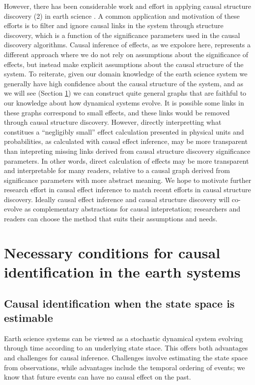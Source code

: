 \documentclass[12pt]{article}
\begin{document}
However, there has been considerable work and effort in applying
causal structure discovery (2) in earth science
\citep[e.g.,][]{ebert-uphoff2012,
  samarasinghe-casuality,runge-causal-timeseries,runge2019inferring}. A
common application and motivation of these efforts is to filter and
ignore causal links in the system through structure discovery, which
is a function of the significance parameters used in the causal
discovery algorithms. Causal inference of effects, as we expolore
here, represents a different approach where we do not rely on
assumptions about the significance of effects, but instead make
explicit assumptions about the causal structure of the system. To
reiterate, given our domain knowledge of the earth science system we
generally have high confidence about the causal structure of the
system, and as we will see (Section \ref{sec:necess-cond-caus}) we can
construct quite general graphs that are faithful to our knowledge
about how dynamical systems evolve. It is possible some links in these
graphs correspond to small effects, and these links would be removed
through causal structure discovery. However, directly interpretting
what constitues a ``negligibly small'' effect calculation presented in
physical units and probabilities, as calculated with causal effect
inference, may be more transparent than intepreting missing links
derived from causal structure discovery significance parameters. In
other words, direct calculation of effects may be more transparent and
interpretable for many readers, relative to a causal graph derived
from significance parameters with more abstract meaning. We hope to
motivate further research effort in causal effect inference to match
recent efforts in causal structure discovery. Ideally causal effect
inference and causal structure discovery will co-evolve as
complementary abstractions for causal intepretation; researchers and
readers can choose the method that suits their assumptions and needs.

\section{Necessary conditions for causal identification in the earth
  systems}
\label{sec:necess-cond-caus}
\subsection{Causal identification when the state space is estimable}
\label{state-space}

Earth science systems can be viewed as a stochastic dynamical system
evolving through time according to an underlying state stace. This
offers both advantages and challenges for causal inference. Challenges
involve estimating the state space from observations, while advantages
include the temporal ordering of events; we know that future events
can have no causal effect on the past.
\end{document}

